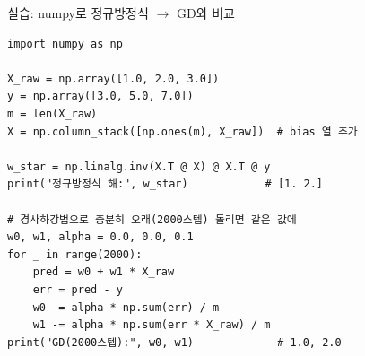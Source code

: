 \begin{frame}[fragile]{실습: numpy로 정규방정식 $\to$ GD와 비교}
\begin{lstlisting}
import numpy as np

X_raw = np.array([1.0, 2.0, 3.0])
y = np.array([3.0, 5.0, 7.0])
m = len(X_raw)
X = np.column_stack([np.ones(m), X_raw])  # bias 열 추가

w_star = np.linalg.inv(X.T @ X) @ X.T @ y
print("정규방정식 해:", w_star)            # [1. 2.]

# 경사하강법으로 충분히 오래(2000스텝) 돌리면 같은 값에
w0, w1, alpha = 0.0, 0.0, 0.1
for _ in range(2000):
    pred = w0 + w1 * X_raw
    err = pred - y
    w0 -= alpha * np.sum(err) / m
    w1 -= alpha * np.sum(err * X_raw) / m
print("GD(2000스텝):", w0, w1)             # 1.0, 2.0
\end{lstlisting}
\end{frame}
